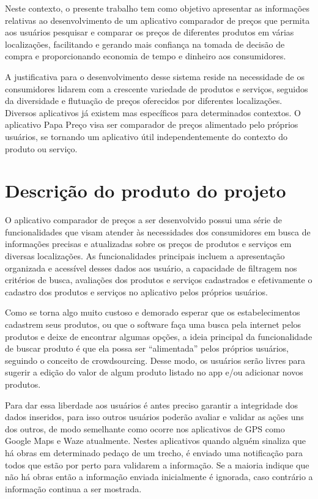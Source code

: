 Neste contexto, o presente trabalho tem como objetivo apresentar as informações relativas ao desenvolvimento de um aplicativo comparador de preços que permita aos usuários pesquisar e comparar os preços de diferentes produtos em várias localizações, facilitando e gerando mais confiança na tomada de decisão de compra e proporcionando economia de tempo e dinheiro aos consumidores.

A justificativa para o desenvolvimento desse sistema reside na necessidade de os consumidores lidarem com a crescente variedade de produtos e serviços, seguidos da diversidade e flutuação de preços oferecidos por diferentes localizações. Diversos aplicativos já existem mas específicos para determinados contextos. O aplicativo Papa Preço visa ser comparador de preços alimentado pelo próprios usuários, se tornando um aplicativo útil independentemente do contexto do produto ou serviço. 





\section{Descrição do produto do projeto} \label{sec:descricaoproduto}
O aplicativo comparador de preços a ser desenvolvido possui uma série de funcionalidades que visam atender às necessidades dos consumidores em busca de informações precisas e atualizadas sobre os preços de produtos e serviços em diversas localizações. As funcionalidades principais incluem a apresentação organizada e acessível desses dados aos usuário, a capacidade de filtragem nos critérios de busca, avaliações dos produtos e serviços cadastrados e efetivamente o cadastro dos produtos e serviços no aplicativo pelos próprios usuários.

Como se torna algo muito custoso e demorado esperar que os estabelecimentos cadastrem seus produtos, ou que o software faça uma busca pela internet pelos produtos e deixe de encontrar algumas opções, a ideia principal da funcionalidade de buscar produto é que ela possa ser ``alimentada'' pelos próprios usuários, seguindo o conceito de crowdsourcing. Desse modo, os usuários serão livres para sugerir a edição do valor de algum produto listado no app e/ou adicionar novos produtos.

Para dar essa liberdade aos usuários é antes preciso garantir a integridade dos dados inseridos, para isso outros usuários poderão avaliar e validar as ações uns dos outros, de modo semelhante como ocorre nos aplicativos de GPS como Google Maps e Waze atualmente. Nestes aplicativos quando alguém sinaliza que há obras em determinado pedaço de um trecho, é enviado uma notificação para todos que estão por perto para validarem a informação. Se a maioria indique que não há obras então a informação enviada inicialmente é ignorada, caso contrário a informação continua a ser mostrada.

